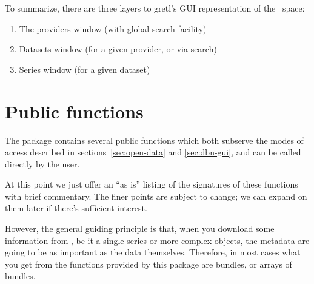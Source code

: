 \documentclass{article}
\begin{document}
To summarize, there are three layers to gretl's GUI representation of
the \DB\ space:
\begin{enumerate}
\item The providers window (with global search facility)
\item Datasets window (for a given provider, or via search)
\item Series window (for a given dataset)
\end{enumerate}

\section{Public functions}
\label{sec:dbn-funcs}

The package contains several public functions which both subserve the
modes of access described in sections~\ref{sec:open-data} and
\ref{sec:dbn-gui}, and can be called directly by the user.

At this point we just offer an ``as is'' listing of the signatures of
these functions with brief commentary. The finer points are subject to
change; we can expand on them later if there's sufficient
interest.

However, the general guiding principle is that, when you download some
information from \DB, be it a single series or more
complex objects, the metadata are going to be as important as the data
themselves. Therefore, in most cases what you get from the functions
provided by this package are bundles, or arrays of bundles.
\end{document}
